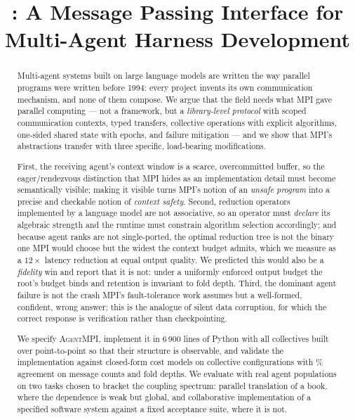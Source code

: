 \documentclass[10pt,twocolumn]{article}
\title{\textbf{\ampi{}: A Message Passing Interface for\\Multi-Agent Harness Development}}
\author{}
\date{}
\theoremstyle{definition}
\theoremstyle{plain}
\newcommand{\ampi}{\textsc{AgentMPI}}
\begin{document}
\maketitle

\begin{abstract}
Multi-agent systems built on large language models are written the way parallel
programs were written before 1994: every project invents its own communication
mechanism, and none of them compose. We argue that the field needs what MPI gave
parallel computing --- not a framework, but a \emph{library-level protocol} with
scoped communication contexts, typed transfers, collective operations with
explicit algorithms, one-sided shared state with epochs, and failure mitigation
--- and we show that MPI's abstractions transfer with three specific, load-bearing
modifications.

First, the receiving agent's context window is a scarce, overcommitted buffer, so
the eager/rendezvous distinction that MPI hides as an implementation detail must
become semantically visible; making it visible turns MPI's notion of an
\emph{unsafe program} into a precise and checkable notion of \emph{context
safety}. Second, reduction operators implemented by a language model are not
associative, so an operator must \emph{declare} its algebraic strength and the runtime
must constrain algorithm selection accordingly; and because agent ranks are not
single-ported, the optimal reduction tree is not the binary one MPI would choose but the
widest the context budget admits, which we measure as a $12\times$ latency reduction at
equal output quality. We predicted this would also be a \emph{fidelity} win and report
that it is not: under a uniformly enforced output budget the root's budget binds and
retention is invariant to fold depth. Third, the dominant agent
failure is not the crash MPI's fault-tolerance work assumes but a well-formed,
confident, wrong answer; this is the analogue of silent data corruption, for which
the correct response is verification rather than checkpointing.

We specify \ampi{}, implement it in 6\,900 lines of Python with all collectives
built over point-to-point so that their structure is observable, and validate the
implementation against closed-form cost models on \NModelConfigs{}
collective configurations with \NModelAgreement\%
agreement on message counts and fold depths. We evaluate with real agent
populations on two tasks chosen to bracket the coupling spectrum: parallel
translation of a book, where the dependence is weak but global, and collaborative
implementation of a specified software system against a fixed acceptance suite,
where it is not.
\end{abstract}
\end{document}
